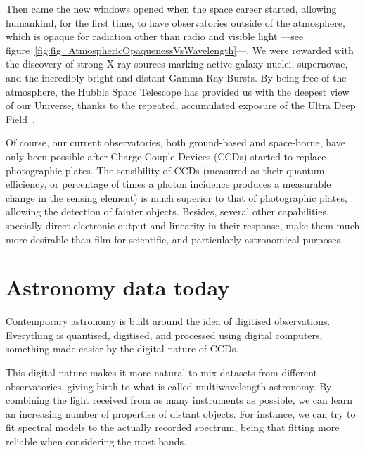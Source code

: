 	 Then came the new windows opened when the space career
	started, allowing humankind, for the first time, to have
	observatories outside of the atmosphere, which is opaque for
	radiation other than radio and visible light ---see
	figure~\ref{fig:fig_AtmosphericOpaquenessVsWavelength}---. We
	were rewarded with the discovery of strong X-ray sources marking
	active galaxy nuclei, supernovae, and the incredibly bright and
	distant Gamma-Ray Bursts. By being free of the atmosphere, the
	Hubble Space Telescope has provided us with the deepest view of
	our Universe, thanks to the repeated, accumulated exposure of
	the Ultra Deep Field~\cite{2006AJ....132.1729B}.
	
	 Of course, our current observatories, both ground-based and
	space-borne, have only been possible after Charge Couple
	Devices (CCDs) started to replace photographic plates. The
	sensibility of CCDs (measured as their quantum efficiency, or
	percentage of times a photon incidence produces a measurable
	change in the sensing element) is much superior to that of
	photographic plates, allowing the detection of fainter
	objects. Besides, several other capabilities, specially direct
	electronic output and linearity in their response, make them
	much more desirable than film for scientific, and particularly
	astronomical purposes.


\section{Astronomy data today} %
\label{sec:astronomy_today}


	Contemporary astronomy is built around the idea of digitised
	observations. Everything is quantised, digitised, and processed
	using digital computers, something made easier by the digital
	nature of CCDs.
	
	 This digital nature makes it more natural to mix datasets from
	different observatories, giving birth to what is called
	multiwavelength astronomy. By combining the light received from
	as many instruments as possible, we can learn an increasing
	number of properties of distant objects. For instance, we can
	try to fit spectral models to the actually recorded spectrum,
	being that fitting more reliable when considering the most
	bands.
	
